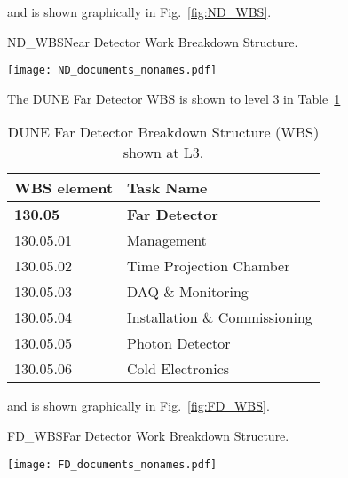 and is shown graphically in Fig.~\ref{fig:ND_WBS}.
\begin{cdrfigure}{ND_WBS}{Near Detector Work Breakdown Structure.}
\centering
\begin{center}
\texttt{[image: ND\_documents\_nonames.pdf]}
\end{center}
\end{cdrfigure}

The DUNE Far Detector WBS is shown to level 3 in Table~\ref{tab:FD_WBS}
\begin{table}[ht!]
\centering
\begin{tabular}{|l||l|} \hline
WBS element & Task Name \\ \hline\hline
{\bf               130.05} & {\bf Far Detector}           \\ \hline
\hspace{1em}130.05.01      & Management                   \\ \hline
\hspace{1em}130.05.02      & Time Projection Chamber      \\ \hline
\hspace{1em}130.05.03      & DAQ \& Monitoring            \\ \hline
\hspace{1em}130.05.04      & Installation \& Commissioning  \\ \hline
\hspace{1em}130.05.05      & Photon Detector              \\ \hline
\hspace{1em}130.05.06      & Cold Electronics             \\ \hline
\end{tabular}
\caption{DUNE Far Detector Breakdown Structure (WBS) shown at L3.}
\label{tab:FD_WBS}
\end{table}
and is shown graphically in Fig.~\ref{fig:FD_WBS}.
\begin{cdrfigure}{FD_WBS}{Far Detector Work Breakdown Structure.}
\centering
\begin{center}
\texttt{[image: FD\_documents\_nonames.pdf]}
\end{center}
\end{cdrfigure}



